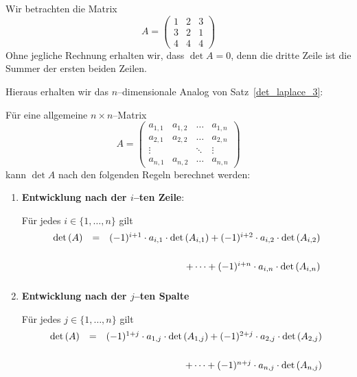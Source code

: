 \medbreak

\begin{beispiel} Wir betrachten die Matrix 
  	$$ A = \left( \begin{matrix} 1 & 2 & 3 \\ 3 & 2 & 1 \\ 4 & 4 & 4 
  	\end{matrix} \right) $$
Ohne jegliche Rechnung erhalten wir, dass $\det{A} = 0$, denn die dritte Zeile ist die Summer der ersten 
beiden Zeilen.
\end{beispiel}

\bigbreak

Hieraus erhalten wir das $n$--dimensionale 
Analog von Satz~\ref{det_laplace_3}:

\begin{satz}\label{det_laplace_n} 
Für eine allgemeine $n \times n$--Matrix
	$$ A = \left( \begin{matrix} a_{1,1} & a_{1,2} & \ldots & a_{1,n} \\
  	a_{2,1} & a_{2,2} & \ldots & a_{2,n} \\
   	\vdots & & \ddots & \vdots \\
  	a_{n,1} & a_{n,2} & \ldots & a_{n,n} \end{matrix} \right) $$
kann $\det{A}$ nach den folgenden Regeln berechnet werden:

\begin{enumerate}
\item \textbf{Entwicklung nach der $i$--ten Zeile}:

Für jedes $i \in \{1, \ldots,n \}$ gilt
  	$$ \begin{array} { l c r}
   	\det{A} & = & (-1)^{i+1} \cdot a_{i,1} \cdot \det{A_{i,1}} + (-1)^{i+2} \cdot  a_{i,2} \cdot \det{A_{i,2}} \\
      	& & \,\, + \cdots + (-1)^{i+n} \cdot a_{i,n}  \cdot \det{A_{i,n}} 
  	\end{array} $$

\item \textbf{Entwicklung nach der $j$--ten Spalte}

Für jedes $j \in \{1, \ldots, n \}$ gilt
  	$$ \begin{array} { l c r}
 	\det{A} & = & (-1)^{1+j} \cdot a_{1,j} \cdot \det{A_{1,j}} + (-1)^{2+j} \cdot a_{2,j}\cdot \det{A_{2,j}} \\
  	& &  \,\,+  \cdots + (-1)^{n+j} \cdot a_{n,j} \cdot \det{A_{n,j}} 
  \end{array} $$
\end{enumerate}
\end{satz}

